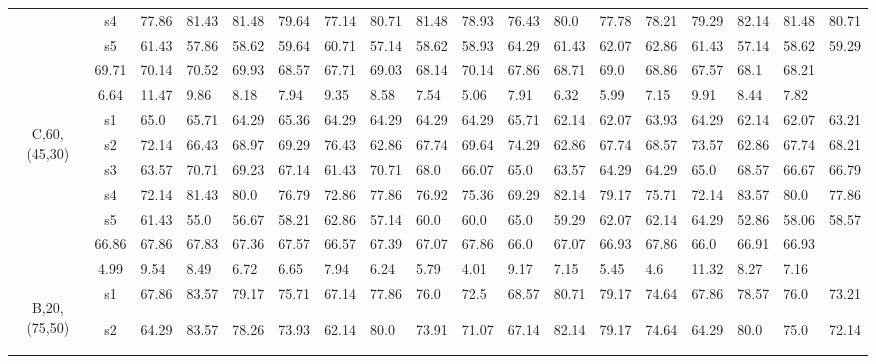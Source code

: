\begin{table}[h]
{\begin{tabular}{cc|llll|llll|llll|llll}
 & s4 & 77.86 & 81.43 & 81.48 & 79.64 & 77.14 & 80.71 & 81.48 & 78.93 & 76.43 & 80.0 & 77.78 & 78.21 & 79.29 & 82.14 & 81.48 & 80.71 \\
 & s5 & 61.43 & 57.86 & 58.62 & 59.64 & 60.71 & 57.14 & 58.62 & 58.93 & 64.29 & 61.43 & 62.07 & 62.86 & 61.43 & 57.14 & 58.62 & 59.29 \\
\rowcolor{lightgray!50}\multicolumn{2}{r|}{avg} & 69.71 & 70.14 & 70.52 & 69.93 & 68.57 & 67.71 & 69.03 & 68.14 & 70.14 & 67.86 & 68.71 & 69.0 & 68.86 & 67.57 & 68.1 & 68.21 \\
\rowcolor{lightgray!50}\multicolumn{2}{r|}{std} & 6.64 & 11.47 & 9.86 & 8.18 & 7.94 & 9.35 & 8.58 & 7.54 & 5.06 & 7.91 & 6.32 & 5.99 & 7.15 & 9.91 & 8.44 & 7.82 \\
\multirow{6}{*}{\begin{sideways}C,60,(45,30)\end{sideways}} & s1 & 65.0 & 65.71 & 64.29 & 65.36 & 64.29 & 64.29 & 64.29 & 64.29 & 65.71 & 62.14 & 62.07 & 63.93 & 64.29 & 62.14 & 62.07 & 63.21 \\
 & s2 & 72.14 & 66.43 & 68.97 & 69.29 & 76.43 & 62.86 & 67.74 & 69.64 & 74.29 & 62.86 & 67.74 & 68.57 & 73.57 & 62.86 & 67.74 & 68.21 \\
 & s3 & 63.57 & 70.71 & 69.23 & 67.14 & 61.43 & 70.71 & 68.0 & 66.07 & 65.0 & 63.57 & 64.29 & 64.29 & 65.0 & 68.57 & 66.67 & 66.79 \\
 & s4 & 72.14 & 81.43 & 80.0 & 76.79 & 72.86 & 77.86 & 76.92 & 75.36 & 69.29 & 82.14 & 79.17 & 75.71 & 72.14 & 83.57 & 80.0 & 77.86 \\
 & s5 & 61.43 & 55.0 & 56.67 & 58.21 & 62.86 & 57.14 & 60.0 & 60.0 & 65.0 & 59.29 & 62.07 & 62.14 & 64.29 & 52.86 & 58.06 & 58.57 \\
\rowcolor{lightgray!50}\multicolumn{2}{r|}{avg} & 66.86 & 67.86 & 67.83 & 67.36 & 67.57 & 66.57 & 67.39 & 67.07 & 67.86 & 66.0 & 67.07 & 66.93 & 67.86 & 66.0 & 66.91 & 66.93 \\
\rowcolor{lightgray!50}\multicolumn{2}{r|}{std} & 4.99 & 9.54 & 8.49 & 6.72 & 6.65 & 7.94 & 6.24 & 5.79 & 4.01 & 9.17 & 7.15 & 5.45 & 4.6 & 11.32 & 8.27 & 7.16 \\
\multirow{6}{*}{\begin{sideways}B,20,(75,50)\end{sideways}} & s1 & 67.86 & 83.57 & 79.17 & 75.71 & 67.14 & 77.86 & 76.0 & 72.5 & 68.57 & 80.71 & 79.17 & 74.64 & 67.86 & 78.57 & 76.0 & 73.21 \\
 & s2 & 64.29 & 83.57 & 78.26 & 73.93 & 62.14 & 80.0 & 73.91 & 71.07 & 67.14 & 82.14 & 79.17 & 74.64 & 64.29 & 80.0 & 75.0 & 72.14 \\

\end{tabular}}
\end{table}
